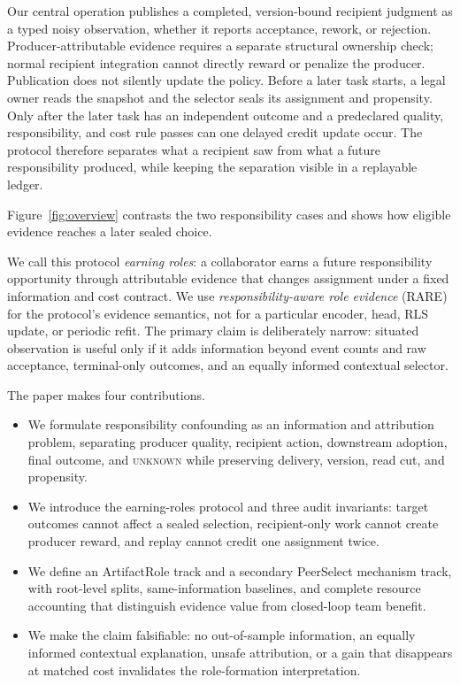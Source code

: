 \documentclass[sigconf,anonymous]{aamas}
\newcommand{\unknown}{\textsc{unknown}}
\begin{document}
Our central operation publishes a completed, version-bound recipient judgment as a typed noisy observation, whether it reports acceptance, rework, or rejection. Producer-attributable evidence requires a separate structural ownership check; normal recipient integration cannot directly reward or penalize the producer. Publication does not silently update the policy. Before a later task starts, a legal owner reads the snapshot and the selector seals its assignment and propensity. Only after the later task has an independent outcome and a predeclared quality, responsibility, and cost rule passes can one delayed credit update occur. The protocol therefore separates what a recipient saw from what a future responsibility produced, while keeping the separation visible in a replayable ledger.

Figure~\ref{fig:overview} contrasts the two responsibility cases and shows how eligible evidence reaches a later sealed choice.

We call this protocol \emph{earning roles}: a collaborator earns a future responsibility opportunity through attributable evidence that changes assignment under a fixed information and cost contract. We use \emph{responsibility-aware role evidence} (RARE) for the protocol's evidence semantics, not for a particular encoder, head, RLS update, or periodic refit. The primary claim is deliberately narrow: situated observation is useful only if it adds information beyond event counts and raw acceptance, terminal-only outcomes, and an equally informed contextual selector.

The paper makes four contributions.
\begin{itemize}
  \item We formulate responsibility confounding as an information and attribution problem, separating producer quality, recipient action, downstream adoption, final outcome, and \unknown{} while preserving delivery, version, read cut, and propensity.
  \item We introduce the earning-roles protocol and three audit invariants: target outcomes cannot affect a sealed selection, recipient-only work cannot create producer reward, and replay cannot credit one assignment twice.
  \item We define an ArtifactRole track and a secondary PeerSelect mechanism track, with root-level splits, same-information baselines, and complete resource accounting that distinguish evidence value from closed-loop team benefit.
  \item We make the claim falsifiable: no out-of-sample information, an equally informed contextual explanation, unsafe attribution, or a gain that disappears at matched cost invalidates the role-formation interpretation.
\end{itemize}
\end{document}
